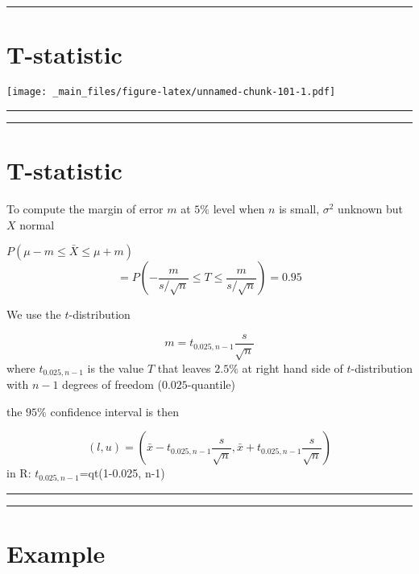 \documentclass[
]{book}
\begin{document}
\begin{center}\rule{0.5\linewidth}{0.5pt}\end{center}

\hypertarget{t-statistic-4}{%
\section{T-statistic}\label{t-statistic-4}}

\texttt{[image: \_main\_files/figure-latex/unnamed-chunk-101-1.pdf]}

\begin{center}\rule{0.5\linewidth}{0.5pt}\end{center}

\begin{center}\rule{0.5\linewidth}{0.5pt}\end{center}

\hypertarget{t-statistic-5}{%
\section{T-statistic}\label{t-statistic-5}}

To compute the margin of error \(m\) at \(5\%\) level when \(n\) is small, \(\sigma^2\) unknown but \(X\) normal

\(P(\mu-m \leq \bar{X} \leq\mu + m)\)
\[=P(-\frac{m}{s/\sqrt{n}} \leq T \leq\frac{m}{s/\sqrt{n}})=0.95\]

We use the \(t\)-distribution

\[m=t_{0.025, n-1} \frac{s}{\sqrt{n}}\]
where \(t_{0.025, n-1}\) is the value \(T\) that leaves \(2.5\%\) at right hand side of \(t\)-distribution with \(n-1\) degrees of freedom (\(0.025\)-quantile)

the \(95\%\) confidence interval is then

\[(l,u)=(\bar{x}-t_{0.025, n-1} \frac{s}{\sqrt{n}}, \bar{x}+t_{0.025, n-1} \frac{s}{\sqrt{n}})\]
in R: \(t_{0.025, n-1}\)=qt(1-0.025, n-1)

\begin{center}\rule{0.5\linewidth}{0.5pt}\end{center}

\begin{center}\rule{0.5\linewidth}{0.5pt}\end{center}

\hypertarget{example-18}{%
\section{Example}\label{example-18}}
\end{document}
